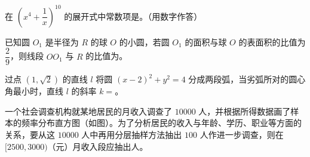 \begin{question}
在 $\left(x^4+\dfrac1x\right)^{10}$ 的展开式中常数项是\gkblank{}。（用数字作答）

\end{question}
\begin{question}
已知圆 $O_1$ 是半径为 $R$ 的球 $O$ 的小圆，若圆 $O_1$ 的面积与球 $O$ 的表面积的比值为 $\dfrac29$，则线段 $OO_1$ 与 $R$ 的比值为\gkblank{}。

\end{question}
\begin{question}
过点 $(1,\sqrt2)$ 的直线 $l$ 将圆 $(x-2)^2+y^2=4$ 分成两段弧，当劣弧所对的圆心角最小时，直线 $l$ 的斜率 $k=$\gkblank{}。

\Needspace{0.4\textheight}
\end{question}
\begin{question}
一个社会调查机构就某地居民的月收入调查了 $10000$ 人，并根据所得数据画了样本的频率分布直方图（如图）。为了分析居民的收入与年龄、学历、职业等方面的关系，要从这 $10000$ 人中再用分层抽样方法抽出 $100$ 人作进一步调查，则在 $[2500,3000)$（元）月收入段应抽出\gkblank{}人。
\nopagebreak[4]
\begin{center}\end{center}
\nopagebreak[4]
\end{question}

